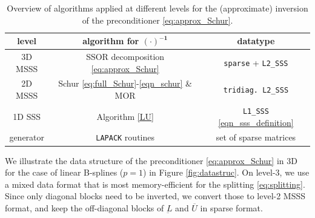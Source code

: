 {\begin{table}[H]
\centering
\caption{Overview of algorithms applied at different levels for the (approximate) inversion of the preconditioner \eqref{eq:approx_Schur}.}\label{tab:algorithms}
\begin{tabular}{|c|c|c|}
 \hline
 \textbf{level} & \textbf{algorithm for} $\mathbf{(\cdot)^{-1}}$& \textbf{datatype} \\
 \hline
 3D MSSS& SSOR decomposition \eqref{eq:approx_Schur} & \texttt{sparse} + \texttt{L2\_SSS}\\
 2D MSSS & Schur \eqref{eq:full_Schur}-\eqref{eqn_schur} \& MOR & \texttt{tridiag. L2\_SSS} \\
 1D SSS\phantom{M}& Algorithm \ref{LU} & \texttt{L1\_SSS} \eqref{eqn_sss_definition}\\
 generator & \texttt{LAPACK} routines & set of sparse matrices\\
 \hline
\end{tabular}
\end{table}

We illustrate the data structure of the preconditioner \eqref{eq:approx_Schur} in 3D for the case of linear B-splines ($p=1$) in Figure \ref{fig:datastruc}. On level-3, we use a mixed data format that is most memory-efficient for the splitting \eqref{eq:splitting}. Since only diagonal blocks need to be inverted, we convert those to level-2 MSSS format, and keep the off-diagonal blocks of $\underbar{L}$ and $\overbar{U}$ in sparse format.
\begin{figure}[ht]
    \centering
    \begin{subfigure}{0.3\columnwidth}
        \centering
\end{subfigure}
\end{figure}}
